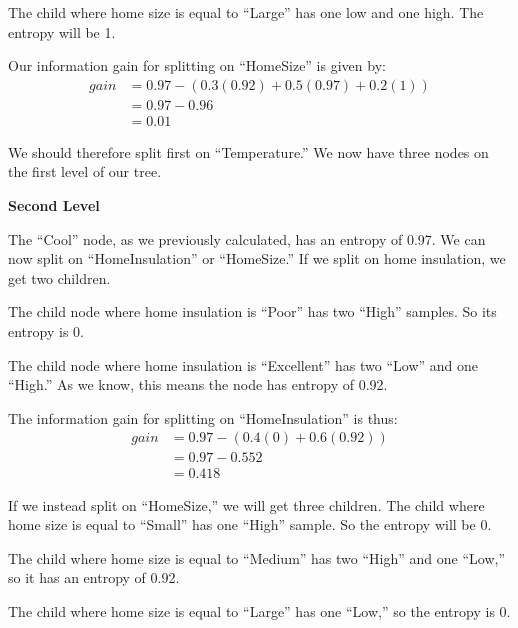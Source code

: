 \documentclass[11pt]{article}
\begin{document}
\begin{enumerate}
\begin{enumerate}
                The child where home size is equal to ``Large'' has one low and
                one high. The entropy will be 1.

                Our information gain for splitting on ``HomeSize'' is given by:
                \begin{align*}
                    gain &= 0.97 - \left(0.3(0.92) + 0.5(0.97) + 0.2(1)\right) \\
                    & = 0.97 - 0.96 \\
                    & = 0.01
                \end{align*}

                We should therefore split first on ``Temperature.'' We now have
                three nodes on the first level of our tree.

                \textbf{Second Level}

                The ``Cool'' node, as we previously calculated, has an entropy
                of 0.97. We can now split on ``HomeInsulation'' or
                ``HomeSize.'' If we split on home insulation, we get two
                children.

                The child node where home insulation is ``Poor'' has two
                ``High'' samples. So its entropy is 0.

                The child node where home insulation is ``Excellent'' has two
                ``Low'' and one ``High.'' As we know, this means the node has
                entropy of 0.92.

                The information gain for splitting on ``HomeInsulation'' is
                thus:
                \begin{align*}
                    gain &= 0.97 - \left(0.4(0) + 0.6(0.92)\right) \\
                    &= 0.97 - 0.552 \\
                    &= 0.418
                \end{align*}

                If we instead split on ``HomeSize,'' we will get three
                children. The child where home size is equal to ``Small'' has
                one ``High'' sample. So the entropy will be 0.

                The child where home size is equal to ``Medium'' has two
                ``High'' and one ``Low,'' so it has an entropy of 0.92.

                The child where home size is equal to ``Large'' has one
                ``Low,'' so the entropy is 0.


\end{enumerate}
\end{enumerate}
\end{document}
